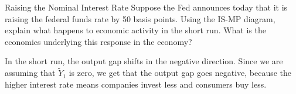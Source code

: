 \documentclass[10pt]{extarticle}
\title{}
\author{Avinash Iyer}
\date{}
\begin{document}
  \begin{problem}{Raising the Nominal Interest Rate}
    Suppose the Fed announces today that it is raising the federal funds rate by 50 basis points. Using the IS-MP diagram, explain what happens to economic activity in the short run. What is the economics underlying this response in the economy?
    \tcblower
      \begin{center}
      \end{center}
      In the short run, the output gap shifts in the negative direction. Since we are assuming that $\tilde{Y}_1$ is zero, we get that the output gap goes negative, because the higher interest rate means companies invest less and consumers buy less.
  \end{problem}
\end{document}
